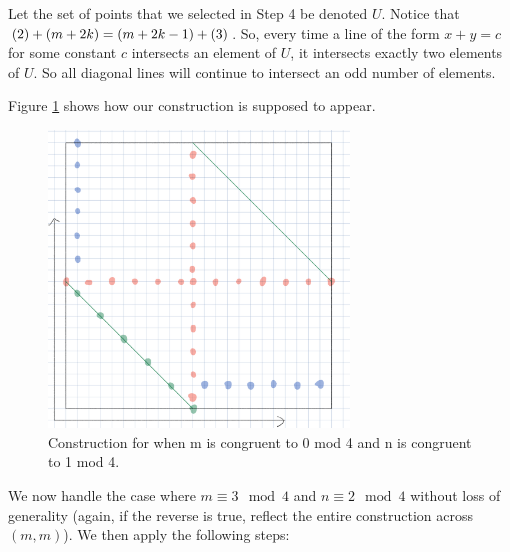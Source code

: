 \documentclass[10pt]{../usamts}
\begin{document}
\begin{solution}
\begin{enumerate}
    Let the set of points that we selected in Step 4 be denoted $U$. Notice that $\left( 2 \right)+\left( m+2k \right) = \left( m+2k-1 \right)+\left( 3 \right)$. So, every time a line of the form $x+y=c$ for some constant $c$ intersects an element of $U$, it intersects exactly two elements of $U$. So all diagonal lines will continue to intersect an odd number of elements.
\end{enumerate}
Figure \ref{fig:zerooneconstruct} shows how our construction is supposed to appear.

\begin{figure}[htbp]
    \includegraphics[width=8cm]{round2/p5construct/construct_12_13.png}
    \caption{Construction for when m is congruent to 0 mod 4 and n is congruent to 1 mod 4.}
    \label{fig:zerooneconstruct}
\end{figure}

\clearpage
We now handle the case where $m \equiv 3 \mod 4$ and $n \equiv 2 \mod 4$ without loss of generality (again, if the reverse is true, reflect the entire construction across $(m,m)$). We then apply the following steps:


\end{solution}
\end{document}
